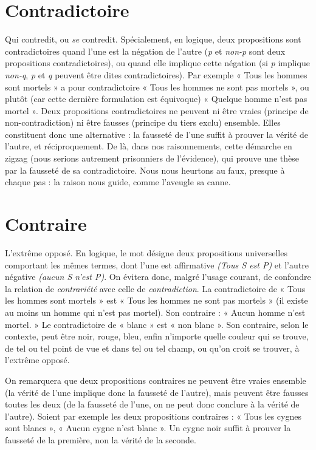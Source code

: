 \section{Contradictoire}
Qui contredit, ou {\it se} contredit. Spécialement, en
logique, deux propositions sont contradictoires quand
l'une est la négation de l’autre ({\it p} et {\it non-p} sont deux propositions contradictoires),
ou quand elle implique cette négation (si {\it p} implique {\it non-q}, {\it p} et {\it q} peuvent
être dites contradictoires). Par exemple « Tous les hommes sont mortels »
a pour contradictoire « Tous les hommes ne sont pas mortels », ou plutôt (car
cette dernière formulation est équivoque) « Quelque homme n’est pas mortel ».
Deux propositions contradictoires ne peuvent ni être vraies (principe de non-contradiction)
ni être fausses (principe du tiers exclu) ensemble. Elles constituent
donc une alternative : la fausseté de l’une suffit à prouver la vérité de
l’autre, et réciproquement. De là, dans nos raisonnements, cette démarche en
zigzag (nous serions autrement prisonniers de l’évidence), qui prouve une thèse
par la fausseté de sa contradictoire. Nous nous heurtons au faux, presque à
chaque pas : la raison nous guide, comme l’aveugle sa canne.

\section{Contraire}
L’extrême opposé. En logique, le mot désigne deux propositions
universelles comportant les mêmes termes, dont l’une
est affirmative {\it (Tous S est P)} et l’autre négative {\it (aucun S n'est P)}. On évitera
donc, malgré l’usage courant, de confondre la relation de {\it contrariété} avec celle
de {\it contradiction}. La contradictoire de « Tous les hommes sont mortels » est
« Tous les hommes ne sont pas mortels » (il existe au moins un homme qui
n’est pas mortel). Son contraire : « Aucun homme n’est mortel. » Le contradictoire
de « blanc » est « non blanc ». Son contraire, selon le contexte, peut être
noir, rouge, bleu, enfin n'importe quelle couleur qui se trouve, de tel ou tel
point de vue et dans tel ou tel champ, ou qu’on croit se trouver, à l'extrême
opposé.

On remarquera que deux propositions contraires ne peuvent être vraies
ensemble (la vérité de l’une implique donc la fausseté de l’autre), mais peuvent
être fausses toutes les deux (de la fausseté de l’une, on ne peut donc
conclure à la vérité de l’autre). Soient par exemple les deux propositions
contraires : « Tous les cygnes sont blancs », « Aucun cygne n’est blanc ». Un
cygne noir suffit à prouver la fausseté de la première, non la vérité de la
seconde.

